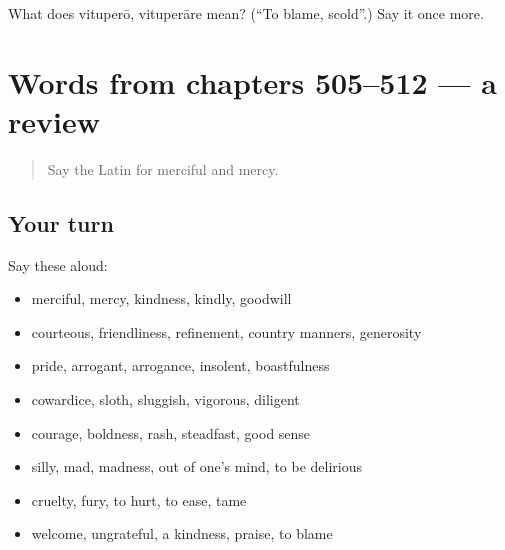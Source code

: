 \begin{tcolorbox}[breakable,colback=teal!4,colframe=teal!35!black,title={Before you move on}]
What does vituperō, vituperāre mean? (\textquotedblleft{}To blame, scold\textquotedblright{}.) Say it once more.
\end{tcolorbox}
\section[(dialogue)]{Words from chapters 505–512 — a review}

\label{lesson:LA-R512-review-505-512}



\begin{quote}
Say the Latin for merciful and mercy.
\end{quote}

\subsection*{Your turn}
Say these aloud:

\begin{itemize}
\raggedright
  \item merciful, mercy, kindness, kindly, goodwill
  \item courteous, friendliness, refinement, country manners, generosity
  \item pride, arrogant, arrogance, insolent, boastfulness
  \item cowardice, sloth, sluggish, vigorous, diligent
  \item courage, boldness, rash, steadfast, good sense
  \item silly, mad, madness, out of one's mind, to be delirious
  \item cruelty, fury, to hurt, to ease, tame
  \item welcome, ungrateful, a kindness, praise, to blame
\end{itemize}

